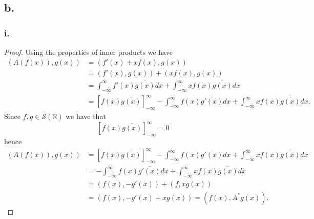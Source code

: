 \documentclass{article}
\begin{document}
\subsection*{b.}
\subsubsection*{i.}
\begin{proof}
    Using the properties of inner products we have 
    \begin{align*}
        (A(f(x)), g(x)) &= (f'(x) + xf(x), g(x)) \\
        &= (f'(x), g(x)) + (xf(x), g(x)) \\
        &= \int_{-\infty}^{\infty}f'(x)\overline{g(x)}dx + \int_{-\infty}^{\infty}xf(x) \overline{g(x)}dx \\
        &= \left[f(x)\overline{g(x)}\right]_{-\infty}^{\infty} - \int_{-\infty}^{\infty}f(x)\overline{g'(x)}dx + \int_{-\infty}^{\infty}xf(x)\overline{g(x)}dx.
    \end{align*}
    Since $f, g \in \mathcal{S}(\mathbb{R})$ we have that 
    \[
       [f(x)\overline{g(x)}]_{-\infty}^{\infty} = 0 
    \]
    hence
    \begin{align*}
        (A(f(x)), g(x)) &= \left[f(x)\overline{g(x)}\right]_{-\infty}^{\infty} - \int_{-\infty}^{\infty}f(x)\overline{g'(x)}dx + \int_{-\infty}^{\infty}xf(x)\overline{g(x)}dx \\
        &= - \int_{-\infty}^{\infty}f(x)\overline{g'(x)}dx + \int_{-\infty}^{\infty}xf(x)\overline{g(x)}dx \\
        &= (f(x), -g'(x)) + (f, xg(x)) \\
        &= (f(x), -g'(x) + xg(x)) = (f(x), A^*g(x)).
    \end{align*}
\end{proof}
\end{document}

